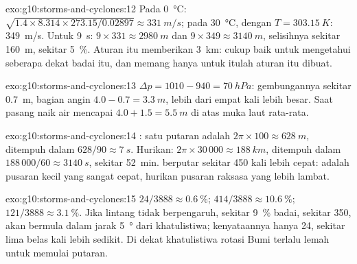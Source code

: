 \begin{solution}{exo:g10:storms-and-cyclones:12}
Pada \qty{0}{\degreeCelsius}: $\sqrt{1.4 \times 8.314 \times 273.15/0.02897}
\approx \qty{331}{m/s}$; pada \qty{30}{\degreeCelsius}, dengan $T =
\qty{303.15}{K}$: \qty{349}{m/s}. Untuk \qty{9}{s}: $9 \times 331 \approx
\qty{2980}{m}$ dan $9 \times 349 \approx \qty{3140}{m}$, selisihnya sekitar
\qty{160}{m}, sekitar \qty{5}{\percent}. Aturan itu memberikan \qty{3}{km}:
cukup baik untuk mengetahui seberapa dekat badai itu, dan memang hanya untuk
itulah aturan itu dibuat.
\end{solution}

\begin{solution}{exo:g10:storms-and-cyclones:13}
$\Delta p = 1010 - 940 = \qty{70}{hPa}$: gembungannya sekitar \qty{0.7}{m},
bagian angin $4.0 - 0.7 = \qty{3.3}{m}$, lebih dari empat kali lebih besar.
Saat pasang naik air mencapai $4.0 + 1.5 = \qty{5.5}{m}$ di atas muka laut
rata-rata.
\end{solution}

\begin{solution}{exo:g10:storms-and-cyclones:14}
: satu putaran adalah $2\pi \times 100 \approx \qty{628}{m}$, ditempuh
dalam $628/90 \approx \qty{7}{s}$. Hurikan: $2\pi \times 30\,000 \approx
\qty{188}{km}$, ditempuh dalam $188\,000/60 \approx \qty{3140}{s}$, sekitar
\qty{52}{min}.  berputar sekitar 450 kali lebih cepat:  adalah
pusaran kecil yang sangat cepat, hurikan pusaran raksasa yang lebih lambat.
\end{solution}

\begin{solution}{exo:g10:storms-and-cyclones:15}
$24/3888 \approx \qty{0.6}{\percent}$; $414/3888 \approx
\qty{10.6}{\percent}$; $121/3888 \approx \qty{3.1}{\percent}$. Jika lintang
tidak berpengaruh, sekitar \qty{9}{\percent} badai, sekitar 350, akan bermula
dalam jarak \qty{5}{\degree} dari khatulistiwa; kenyataannya hanya 24, sekitar
lima belas kali lebih sedikit. Di dekat khatulistiwa rotasi Bumi terlalu lemah
untuk memulai putaran.
\end{solution}

